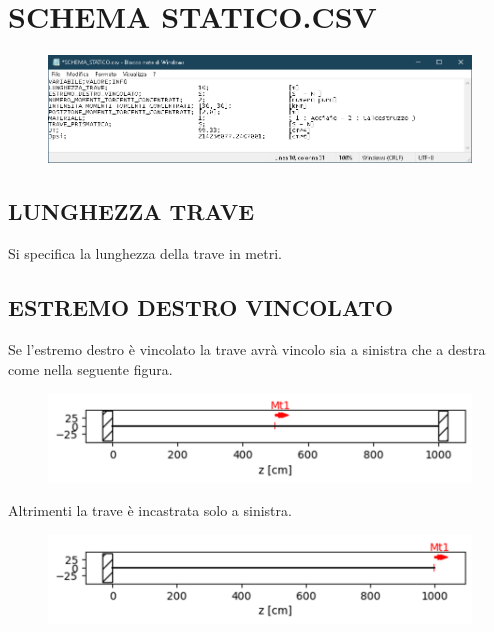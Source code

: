 \documentclass[12pt  , a4, titlepage]{article}
\begin{document}
	\section*{SCHEMA STATICO.CSV}
	\begin{figure}[h!]
		\centering
		\includegraphics[width=\linewidth]{FIGURE/SCHEMA STATICO_TOT}
		\caption{}
		\label{fig:SCHEMA STATICO_TOT}
	\end{figure}
	\subsection*{LUNGHEZZA TRAVE}
	Si specifica la lunghezza della trave in metri.
	\subsection*{ESTREMO DESTRO VINCOLATO}
	Se l'estremo destro è vincolato la trave avrà vincolo sia a sinistra che a destra come nella seguente figura.
	
		\begin{figure}[h!]
		\centering
		\includegraphics[width=\linewidth]{FIGURE/DOPPIO INCASTRO}
		\caption{}
		\label{fig:SCHEMA DOPPIO INCASTRO}
	\end{figure}

	Altrimenti la trave è incastrata solo a sinistra.
	
		\begin{figure}[h!]
		\centering
		\includegraphics[width=\linewidth]{FIGURE/SINGOLO INCASTRO}
		\caption{}
		\label{fig:SCHEMA SINGOLO INCASTRO}
	\end{figure}
\end{document}
